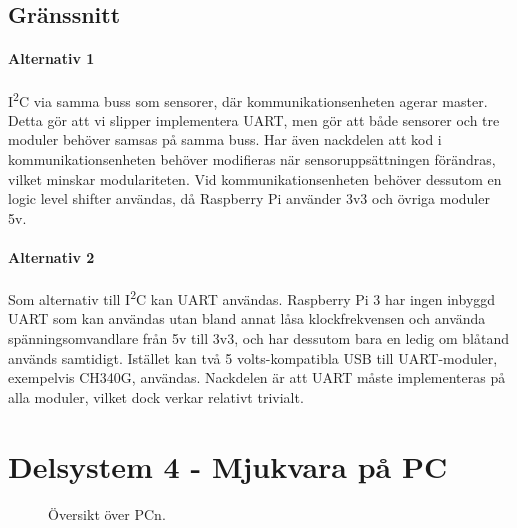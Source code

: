\documentclass[a4paper,11pt]{article}
\begin{document}
\subsection{Gränssnitt} \label{ssec:brainInterface}

\paragraph{Alternativ 1}
I\textsuperscript{2}C via samma buss som sensorer, där kommunikationsenheten agerar master. Detta gör att vi slipper implementera UART, men gör att både sensorer och tre moduler behöver samsas på samma buss. Har även nackdelen att kod i kommunikationsenheten behöver modifieras när sensoruppsättningen förändras, vilket minskar modulariteten. %
Vid kommunikationsenheten behöver dessutom en logic level shifter användas, då Raspberry Pi använder 3v3 och övriga moduler 5v.

\paragraph{Alternativ 2}
Som alternativ till I\textsuperscript{2}C kan UART användas. Raspberry Pi 3 har ingen inbyggd UART som kan användas utan bland annat låsa klockfrekvensen och använda spänningsomvandlare från 5v till 3v3, och har dessutom bara en ledig om blåtand används samtidigt. Istället kan två 5 volts-kompatibla USB till UART-moduler, exempelvis CH340G, användas. Nackdelen är att UART måste implementeras på alla moduler, vilket dock verkar relativt trivialt. %

\newpage
\section{Delsystem 4 - Mjukvara på PC} \label{sec:system4}
\begin{figure}[h!]
    \caption{Översikt över PCn.}
    \label{fig:modules}
\end{figure}
\end{document}
